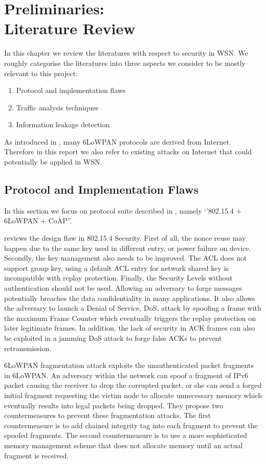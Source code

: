\chapter{Preliminaries:\\ Literature Review} \label{Chp: LiteratureReview}

In this chapter we review the literatures with respect to security in WSN. We roughly categorise the literatures into three aspects we consider to be mostly relevant to this project:

\begin{enumerate}
	\item Protocol and implementation flaws
	\item Traffic analysis techniques
	\item Information leakage detection
\end{enumerate}

As introduced in , many 6LoWPAN protocols are derived from Internet. Therefore in this report we also refer to existing attacks on Internet that could potentially be applied in WSN.

\section{Protocol and Implementation Flaws}

In this section we focus on protocol suite described in , namely `'802.15.4 + 6LoWPAN + CoAP''.

\cite{802154sec} reviews the design flaw in 802.15.4 Security. First of all, the nonce reuse may happen due to the same key used in different entry, or power failure on device. Secondly, the key management also needs to be improved. The ACL does not support group key, using a default ACL entry for network shared key is incompatible with replay protection. Finally, the Security Levels without authentication should not be used. Allowing an adversary to forge messages potentially breaches the data confidentiality in many applications. It also allows the adversary to launch a Denial of Service, DoS, attack by spoofing a frame with the maximum Frame Counter which eventually triggers the replay protection on later legitimate frames. In addition, the lack of security in ACK frames can also be exploited in a jamming DoS attack to forge false ACKs to prevent retransmission.

6LoWPAN fragmentation attack\cite{6lpFragAtk} exploits the unauthenticated packet fragments in 6LoWPAN. An adversary within the network can spoof a fragment of IPv6 packet causing the receiver to drop the corrupted  packet, or she can send a forged initial fragment requesting the victim node to allocate unnecessary memory which eventually results into legal packets being dropped. They propose two countermeasures to prevent these fragmentation attacks. The first countermeasure is to add chained integrity tag into each fragment to prevent the spoofed fragments. The second countermeasure is to use a more sophisticated memory management scheme that does not allocate memory until an actual fragment is received.

